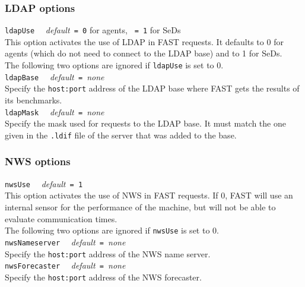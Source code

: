 \subsubsection{LDAP options}

\noindent
\texttt{ldapUse} \ \ \emph{default}\texttt{ = 0} for agents, \texttt{
= 1} for SeDs\\ This option activates the use of LDAP in FAST
requests. It defaults to 0 for agents (which do not need to connect to
the LDAP base) and to 1 for SeDs.  \\

The following two options are ignored if \texttt{ldapUse} is set to 0.
\\

\noindent
\texttt{ldapBase} \ \ \emph{default}\texttt{ = }\emph{none}\\ Specify
the \texttt{host:port} address of the LDAP base where FAST gets the
results of its benchmarks.  \\

\noindent
\texttt{ldapMask} \ \ \emph{default}\texttt{ = }\emph{none}\\ Specify
the mask used for requests to the LDAP base. It must match the one
given in the \texttt{.ldif} file of the server that was added to the
base.


\subsubsection{NWS options}

\noindent
\texttt{nwsUse} \ \ \emph{default}\texttt{ = 1}\\ This option
activates the use of NWS in FAST requests. If 0, FAST will use an
internal sensor for the performance of the machine, but will not be
able to evaluate communication times.  \\

The following two options are ignored if \texttt{nwsUse} is set to 0.
\\

\noindent
\texttt{nwsNameserver} \ \ \emph{default}\texttt{ = }\emph{none}\\
Specify the \texttt{host:port} address of the NWS name server.
\\

\noindent
\texttt{nwsForecaster} \ \ \emph{default}\texttt{ = }\emph{none}\\
Specify the \texttt{host:port} address of the NWS forecaster.
\\


